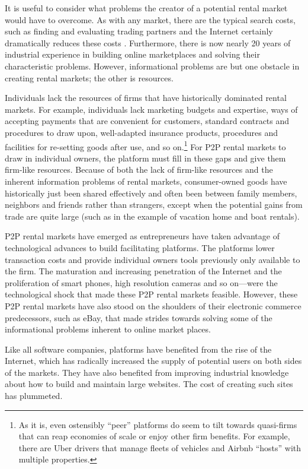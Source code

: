 \documentclass[11pt]{article}
\begin{document}
It is useful to consider what problems the creator of a potential rental market would have to overcome.
As with any market, there are the typical search costs, such as finding and evaluating trading partners and the Internet certainly dramatically reduces these costs \citep{bakos1997reducing}.
Furthermore, there is now nearly 20 years of industrial experience in building online marketplaces and solving their characteristic problems. 
However, informational problems are but one obstacle in creating rental markets; the other is resources. 

Individuals lack the resources of firms that have historically dominated rental markets. 
For example, individuals lack marketing budgets and expertise, ways of accepting payments that are convenient for customers, standard contracts and procedures to draw upon, well-adapted insurance products, procedures and facilities for re-setting goods after use, and so on.\footnote{
  As it is, even ostensibly ``peer'' platforms do seem to tilt towards quasi-firms that can reap economies of scale or enjoy other firm benefits.
  For example, there are Uber drivers that manage fleets of vehicles and Airbnb ``hosts'' with multiple properties. 
  }
For P2P rental markets to draw in individual owners, the platform must fill in these gaps and give them firm-like resources. 
Because of both the lack of firm-like resources and the inherent information problems of rental markets, consumer-owned goods have historically just been shared effectively and often been between family members, neighbors and friends rather than strangers, except when the potential gains from trade are quite large (such as in the example of vacation home and boat rentals). 

P2P rental markets have emerged as entrepreneurs have taken advantage of technological advances to build facilitating platforms. 
The platforms lower transaction costs and provide individual owners tools previously only available to the firm. 
The maturation and increasing penetration of the Internet and the proliferation of smart phones, high resolution cameras and so on---were the technological shock that made these P2P rental markets feasible. 
However, these P2P rental markets have also stood on the shoulders of their electronic commerce predecessors, such as eBay, that made strides towards solving some of the informational problems inherent to online market places. 

Like all software companies, platforms have benefited from the rise of the Internet, which has radically increased the supply of potential users on both sides of the markets. 
They have also benefited from improving industrial knowledge about how to build and maintain large websites.
The cost of creating such sites has plummeted. 
\end{document}
